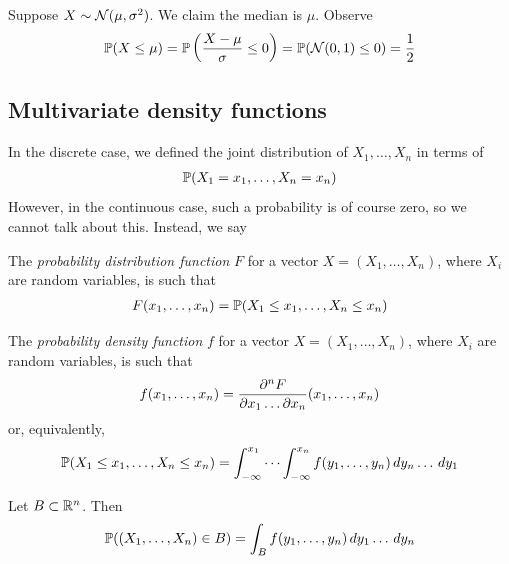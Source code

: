 \documentclass{../../template/note}
\begin{document}
    \begin{example*}
        Suppose \(X \sim \mathcal{N}(\mu, \sigma^2)\). We claim the median is \(\mu\). Observe
        \begin{align*}
            \mathbb P(X \leq \mu) = \mathbb P\left(\frac{X-\mu}{\sigma} \leq 0\right) = \mathbb P(\mathcal{N}(0, 1) \leq 0) = \frac 1 2
        \end{align*}
    \end{example*}
    
    \subsection{Multivariate density functions}

    In the discrete case, we defined the joint distribution of \(X_1, \dots, X_n\) in terms of
    \begin{align*}
        \mathbb P(X_1 = x_1, \dots, X_n = x_n)
    \end{align*}
    However, in the continuous case, such a probability is of course zero, so we cannot talk about this. Instead, we say

    \begin{definition}
        The \emph{probability distribution function} \(F\) for a vector \(X = (X_1, \dots, X_n)\), where \(X_i\) are random variables, is such that
        \begin{align*}
            F(x_1, \dots, x_n) = \mathbb P(X_1 \leq x_1, \dots, X_n \leq x_n)
        \end{align*}
    \end{definition}
    
    \begin{definition}
        The \emph{probability density function} \(f\) for a vector \(X = (X_1, \dots, X_n)\), where \(X_i\) are random variables, is such that
        \begin{align*}
            f(x_1, \dots, x_n) = \pd{^nF}{x_1\dots \pr x_n}(x_1, \dots, x_n)
        \end{align*}
        or, equivalently,
        \begin{align*}
            \mathbb P(X_1 \leq x_1, \dots, X_n \leq x_n) = \int_{-\infty}^{x_1} \cdots \int_{-\infty}^{x_n} f(y_1, \dots, y_n) \,d{y}_n \dots \,d{y}_1
        \end{align*}        
    \end{definition}
    
    \begin{proposition}
        Let \(B \subset \mathbb R^n\). Then
        \begin{align*}
            \mathbb P((X_1, \dots, X_n) \in B) = \int_B f(y_1, \dots, y_n) \,d{y}_1 \dots \,d{y}_n
        \end{align*}
    \end{proposition}
    
\end{document}
